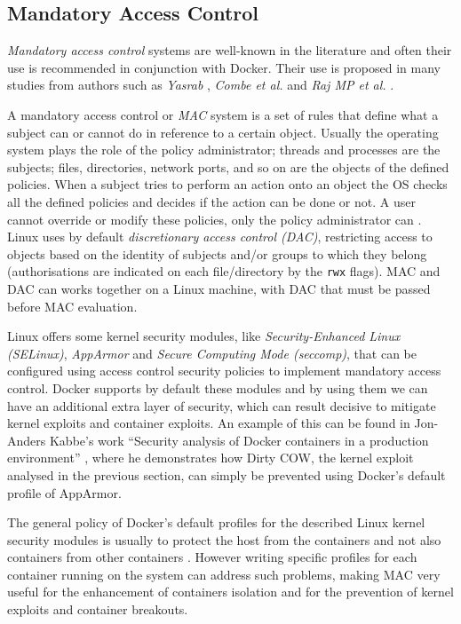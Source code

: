 \documentclass[a4paper,12pt]{article}
\newcommand{\code}[1]{\lstinline|#1|}
\begin{document}
\subsection{Mandatory Access Control}

\textit{Mandatory access control} systems are well-known in the literature and
often their use is recommended in conjunction with Docker. Their use is proposed
in many studies from authors such as \textit{Yasrab}
\cite[Sec.~4.1]{mitigating_docker_security_issues_yasrab}, \textit{Combe et al.}
\cite{to_docker_or_not_to_docker} and \textit{Raj MP et al.}
\cite[Sec.~3.a-b]{raj_et_al}.\par A  mandatory access control or \textit{MAC}
system is a set of rules that define what a subject can or cannot do in
reference to a certain object. Usually the operating system plays the role of
the policy administrator; threads and processes are the subjects; files,
directories, network ports, and so on are the objects of the defined policies.
When a subject tries to perform an action onto an object the OS checks all the
defined policies and decides if the action can be done or not. A user cannot
override or modify these policies, only the policy administrator can
\cite{wiki_MAC}. Linux uses by default \textit{discretionary access control
(DAC)}, restricting access to objects based on the identity of subjects and/or
groups to which they belong (authorisations are indicated on each file/directory
by the \code{rwx} flags). MAC and DAC can works together on a Linux machine,
with DAC that must be passed before MAC evaluation.\par Linux offers some kernel
security modules, like \textit{Security-Enhanced Linux (SELinux)},
\textit{AppArmor} and \textit{Secure Computing Mode (seccomp)}, that can be
configured using access control security policies to implement mandatory access
control. Docker supports by default these modules and by using them we can have
an additional extra layer of security, which can result decisive to mitigate
kernel exploits and container exploits. An example of this can be found in
Jon-Anders Kabbe's work ``Security analysis of Docker containers in a production
environment'' \cite[Sec.~4.2.1]{kabbe_security_docker}, where he demonstrates
how Dirty COW, the kernel exploit analysed in the previous section, can simply
be prevented using Docker's default profile of AppArmor. \par  The general
policy of Docker's default profiles for the described Linux kernel security
modules is usually to protect the host from the containers and not also
containers from other containers \cite{to_docker_or_not_to_docker}. However
writing specific profiles for each container running on the system can address
such problems, making MAC very useful for the enhancement of containers
isolation and for the prevention of kernel exploits and container breakouts. 
\end{document}
